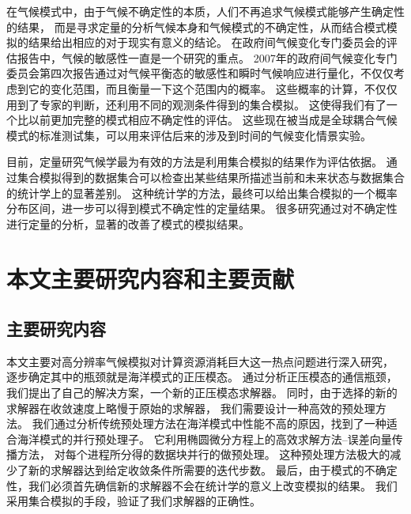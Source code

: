 在气候模式中，由于气候不确定性的本质，人们不再追求气候模式能够产生确定性的结果，
而是寻求定量的分析气候本身和气候模式的不确定性，从而结合模式模拟的结果给出相应的对于现实有意义的结论。
在政府间气候变化专门委员会的评估报告中，气候的敏感性一直是一个研究的重点。
2007年的政府间气候变化专门委员会第四次报告通过对气候平衡态的敏感性和瞬时气候响应进行量化，不仅仅考虑到它的变化范围，而且衡量一下这个范围内的概率。
这些概率的计算，不仅仅用到了专家的判断，还利用不同的观测条件得到的集合模拟。 
这使得我们有了一个比以前更加完整的模式相应不确定性的评估。 
这些现在被当成是全球耦合气候模式的标准测试集，可以用来评估后来的涉及到时间的气候变化情景实验\cite{meehl2007global}。 
 
目前，定量研究气候学最为有效的方法是利用集合模拟的结果作为评估依据\cite{von2013testing,reynolds1994random, allen2002towards}。
通过集合模拟得到的数据集合可以检查出某些结果所描述当前和未来状态与数据集合的统计学上的显著差别。
这种统计学的方法，最终可以给出集合模拟的一个概率分布区间，进一步可以得到模式不确定性的定量结果。
很多研究通过对不确定性进行定量的分析，显著的改善了模式的模拟结果\cite{reynolds1994random}。


\section{本文主要研究内容和主要贡献}
\subsection{主要研究内容}
本文主要对高分辨率气候模拟对计算资源消耗巨大这一热点问题进行深入研究，
逐步确定其中的瓶颈就是海洋模式的正压模态。
通过分析正压模态的通信瓶颈，我们提出了自己的解决方案，一个新的正压模态求解器。
同时，由于选择的新的求解器在收敛速度上略慢于原始的求解器， 我们需要设计一种高效的预处理方法。
我们通过分析传统预处理方法在海洋模式中性能不高的原因，找到了一种适合海洋模式的并行预处理子。 它利用椭圆微分方程上的高效求解方法--误差向量传播方法， 对每个进程所分得的数据块并行的做预处理。 
这种预处理方法极大的减少了新的求解器达到给定收敛条件所需要的迭代步数。
最后，由于模式的不确定性，我们必须首先确信新的求解器不会在统计学的意义上改变模拟的结果。 
我们采用集合模拟的手段，验证了我们求解器的正确性。 

